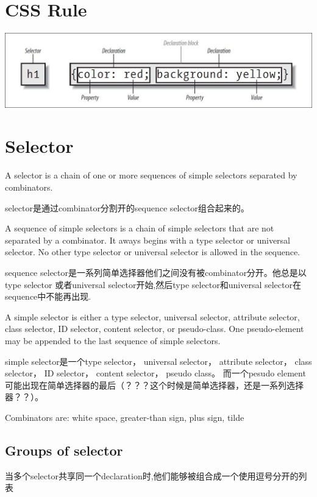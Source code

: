 \section{CSS Rule}

\includegraphics[scale=0.75]{css/resources/css-rule.jpg}

\section{Selector}

A selector is a chain of one or more sequences of simple selectors separated by combinators.

selector是通过combinator分割开的sequence selector组合起来的。

A sequence of simple selectors is a chain of simple selectors that are not separated by a combinator. It aways begins with a type selector or universal selector. No other type selector or universal selector is allowed in the sequence.

sequence selector是一系列简单选择器他们之间没有被combinator分开。他总是以type selector 或者universal selector开始,然后type selector和universal selector在sequence中不能再出现.

A simple selector is either a type selector, universal selector, attribute selector, class selector, ID selector, content selector, or pseudo-class. One pseudo-element may be appended to the last sequence of simple selectors.


simple selector是一个type selector， universal selector， attribute selector， class selector， ID selector， content selector， pseudo class。 而一个pesudo element可能出现在简单选择器的最后（？？？这个时候是简单选择器，还是一系列选择器？？）。


Combinators are: white space, greater-than sign, plus sign, tilde

\subsection{Groups of selector}

当多个selector共享同一个declaration时,他们能够被组合成一个使用逗号分开的列表


